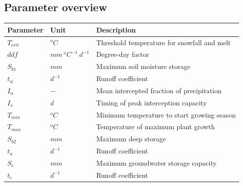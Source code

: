 \subsection{Parameter overview}
\begin{table}[htbp]
  \centering
    \begin{tabular}{lll}
    \toprule
    Parameter & Unit  & Description \\
    \midrule
    $T_{crit}$ & $^oC$ & Threshold temperature for snowfall and melt \\
    $ddf$ & $mm~^oC^{-1}~d^{-1}$ & Degree-day factor \\
    $S_{b1}$ & $mm$  & Maximum soil moisture storage \\
    $t_w$ & $d^{-1}$ & Runoff coefficient \\
    $I_{\alpha}$ & $-$   & Mean intercepted fraction of precipitation \\
    $I_{s}$ & $d$   & Timing of peak interception capacity \\
    $T_{min}$ & $^oC$ & Minimum temperature to start growing season \\
    $T_{max}$ & $^oC$ & Temperature of maximum plant growth \\
    $S_{b2}$ & $mm$  & Maximum deep storage \\
    $t_u$ & $d^{-1}$ & Runoff coefficient \\
    $S_e$ & $mm$  & Maximum groundwater storage capacity \\
    $t_c$ & $d^{-1}$ & Runoff coefficient \\
    \bottomrule
    \end{tabular}%
  \label{tab:addlabel}%
\end{table}%

